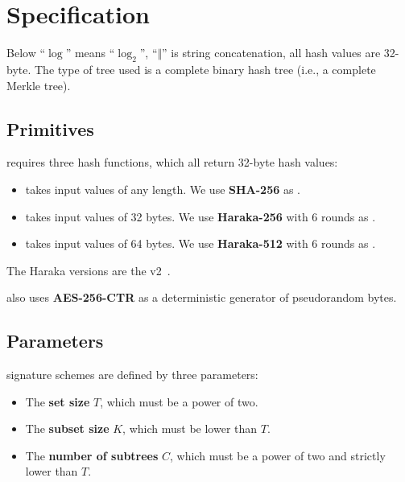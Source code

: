 \chapter{Specification}\label{chap:specification}

Below ``$\log$'' means ``$\log_2$'', ``$\Vert$'' is string concatenation, all hash values are 32-byte. The type of tree used is a complete binary hash tree (i.e., a complete Merkle tree).

\section{Primitives}

\gravity requires three hash functions, which all return 32-byte hash
values:

\begin{itemize}

\item \hashx takes input values of any length. We use \textbf{SHA-256} as \hashx.

\item \hashy takes input values of 32 bytes. We use \textbf{Haraka-256} with 6 rounds as \hashy.

\item \hashz takes input values of 64 bytes. We use \textbf{Haraka-512} with 6 rounds as \hashz.

\end{itemize}
The Haraka versions are the v2~\cite{haraka}.

\gravity also uses \textbf{AES-256-CTR} as a deterministic generator of pseudorandom bytes.



\section{Parameters}

\gravity signature schemes are defined by three parameters:

\begin{itemize}

\item The \textbf{set size} $T$, which must be a power of two.

\item The \textbf{subset size} $K$, which must be lower than $T$.

\item The \textbf{number of subtrees} $C$, which must be a power of two and strictly lower than $T$.

\end{itemize}

